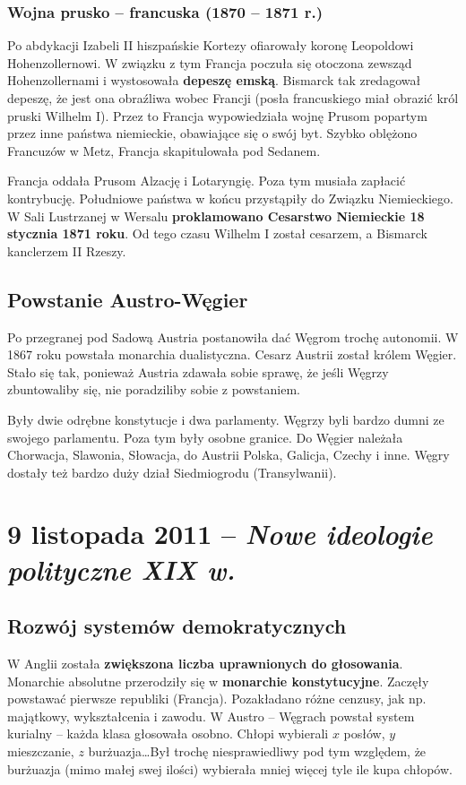 \documentclass [a4paper, 11pt, oneside]{book}
\begin{document}
        \subsection{Wojna prusko -- francuska (1870 -- 1871 r.)} %
        \label{sub:wojna_prusko_francuska_}
            Po abdykacji Izabeli II hiszpańskie Kortezy ofiarowały koronę Leopoldowi Hohenzollernowi. W związku z tym Francja poczuła się otoczona zewsząd Hohenzollernami i wystosowała \textbf{depeszę emską}. Bismarck tak zredagował depeszę, że jest ona obraźliwa wobec Francji (posła francuskiego miał obrazić król pruski Wilhelm I). Przez to Francja wypowiedziała wojnę Prusom popartym przez inne państwa niemieckie, obawiające się o swój byt. Szybko oblężono Francuzów w Metz, Francja skapitulowała pod Sedanem.

            Francja oddała Prusom Alzację i Lotaryngię. Poza tym musiała zapłacić kontrybucję. Południowe państwa w końcu przystąpiły do Związku Niemieckiego. W Sali Lustrzanej w Wersalu \textbf{proklamowano Cesarstwo Niemieckie 18 stycznia 1871 roku}. Od tego czasu Wilhelm I został cesarzem, a Bismarck kanclerzem II Rzeszy.
    \section{Powstanie Austro-Węgier} %
    \label{sec:powstanie_austro_w_gier}
        Po przegranej pod Sadową Austria postanowiła dać Węgrom trochę autonomii. W 1867 roku powstała monarchia dualistyczna. Cesarz Austrii został królem Węgier. Stało się tak, ponieważ Austria zdawała sobie sprawę, że jeśli Węgrzy zbuntowaliby się, nie poradziliby sobie z powstaniem.

        Były dwie odrębne konstytucje i dwa parlamenty. Węgrzy byli bardzo dumni ze swojego parlamentu. Poza tym były osobne granice. Do Węgier należała Chorwacja, Slawonia, Słowacja, do Austrii Polska, Galicja, Czechy i inne. Węgry dostały też bardzo duży dział Siedmiogrodu (Transylwanii).
\chapter{9 listopada 2011 -- \textit{Nowe ideologie polityczne XIX w.}} %
\label{cha:9_listopada_2011_textit}
    \section{Rozwój systemów demokratycznych} %
    \label{sec:rozw_j_system_w_demokratycznych}
        W Anglii została \textbf{zwiększona liczba uprawnionych do głosowania}. Monarchie absolutne przerodziły się w \textbf{monarchie konstytucyjne}. Zaczęły powstawać pierwsze republiki (Francja). Pozakładano różne cenzusy, jak np. majątkowy, wykształcenia i zawodu. W Austro -- Węgrach powstał system kurialny -- każda klasa głosowała osobno. Chłopi wybierali $x$ posłów, $y$ mieszczanie, $z$ burżuazja\dots Był trochę niesprawiedliwy pod tym względem, że burżuazja (mimo małej swej ilości) wybierała mniej więcej tyle ile kupa chłopów.
\end{document}
